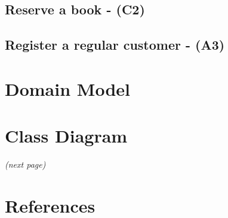 \documentclass{article}
\begin{document}
\newpage
\subsection{Reserve a book - (C2)}



\newpage
\subsection{Register a regular customer - (A3)}


\newpage
\section{Domain Model}


\newpage
\section{Class Diagram}
\textit{(next page)}


\newpage
\section{References}


\end{document}

